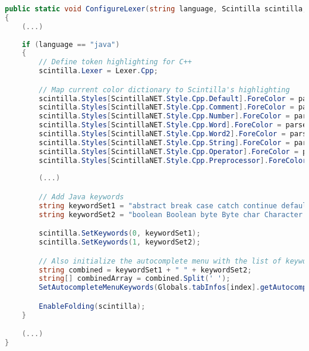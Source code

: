\begin{lstlisting}[language=csharp, caption={The ConfigureLexer() method, that gets called whenever the user opens a new file or changes Pie's theme}]
public static void ConfigureLexer(string language, Scintilla scintilla, KryptonDockableNavigator tabControl, int index)
{
    (...)
    
    if (language == "java")
    {
        // Define token highlighting for C++
        scintilla.Lexer = Lexer.Cpp;

        // Map current color dictionary to Scintilla's highlighting
        scintilla.Styles[ScintillaNET.Style.Cpp.Default].ForeColor = parserColorDictionary["Default"];
        scintilla.Styles[ScintillaNET.Style.Cpp.Comment].ForeColor = parserColorDictionary["Comment"];
        scintilla.Styles[ScintillaNET.Style.Cpp.Number].ForeColor = parserColorDictionary["Number"];
        scintilla.Styles[ScintillaNET.Style.Cpp.Word].ForeColor = parserColorDictionary["Word"];
        scintilla.Styles[ScintillaNET.Style.Cpp.Word2].ForeColor = parserColorDictionary["Word2"];
        scintilla.Styles[ScintillaNET.Style.Cpp.String].ForeColor = parserColorDictionary["String"];
        scintilla.Styles[ScintillaNET.Style.Cpp.Operator].ForeColor = parserColorDictionary["Operator"];
        scintilla.Styles[ScintillaNET.Style.Cpp.Preprocessor].ForeColor = parserColorDictionary["Preprocessor"];
        
        (...)

        // Add Java keywords
        string keywordSet1 = "abstract break case catch continue default do else extern false finally for native super extends final native transient volatile implements synchronized if instanceof import package interface new null private protected public record return sizeof switch this throw throws true try while";
        string keywordSet2 = "boolean Boolean byte Byte char Character class double Double enum float Float int Integer long Long short Short static String void";

        scintilla.SetKeywords(0, keywordSet1);
        scintilla.SetKeywords(1, keywordSet2);

        // Also initialize the autocomplete menu with the list of keywords
        string combined = keywordSet1 + " " + keywordSet2;
        string[] combinedArray = combined.Split(' ');
        SetAutocompleteMenuKeywords(Globals.tabInfos[index].getAutocompleteMenu(), combinedArray.ToList());

        EnableFolding(scintilla);
    }

    (...)
}
\end{lstlisting}

